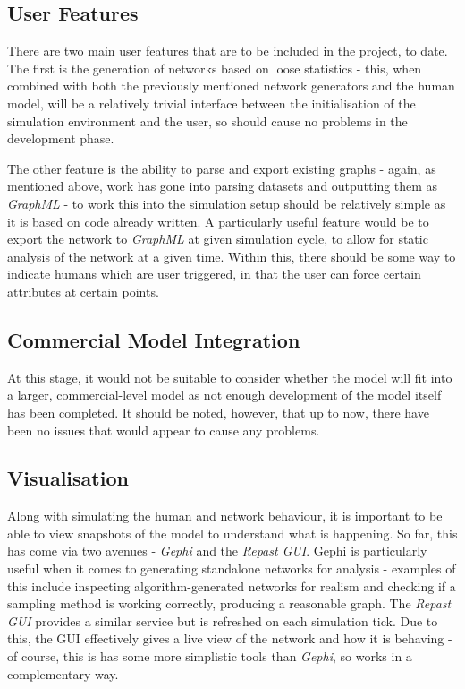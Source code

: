 \documentclass[]{article}
\begin{document}
\subsection{User Features}

There are two main user features that are to be included in the project, to date. The first is the generation of networks based on loose statistics - this, when combined with both the previously mentioned network generators and the human model, will be a relatively trivial interface between the initialisation of the simulation environment and the user, so should cause no problems in the development phase. 

The other feature is the ability to parse and export existing graphs - again, as mentioned above, work has gone into parsing datasets and outputting them as \emph{GraphML} - to work this into the simulation setup should be relatively simple as it is based on code already written. A particularly useful feature would be to export the network to \emph{GraphML} at given simulation cycle, to allow for static analysis of the network at a given time. Within this, there should be some way to indicate humans which are user triggered, in that the user can force certain attributes at certain points.

\subsection{Commercial Model Integration}

At this stage, it would not be suitable to consider whether the model will fit into a larger, commercial-level model as not enough development of the model itself has been completed. It should be noted, however, that up to now, there have been no issues that would appear to cause any problems. 

\subsection{Visualisation}

Along with simulating the human and network behaviour, it is important to be able to view snapshots of the model to understand what is happening. So far, this has come via two avenues - \emph{Gephi} and the \emph{Repast GUI}. Gephi is particularly useful when it comes to generating standalone networks for analysis - examples of this include inspecting algorithm-generated networks for realism and checking if a sampling method is working correctly, producing a reasonable graph. The \emph{Repast GUI} provides a similar service but is refreshed on each simulation tick. Due to this, the GUI effectively gives a live view of the network and how it is behaving - of course, this is has some more simplistic tools than \emph{Gephi}, so works in a complementary way.
\end{document}
